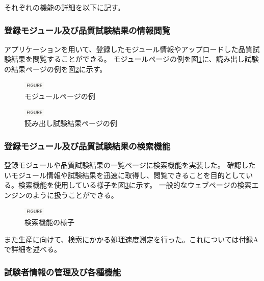 それぞれの機能の詳細を以下に記す。

\subsubsection{登録モジュール及び品質試験結果の情報閲覧}
アプリケーションを用いて、登録したモジュール情報やアップロードした品質試験結果を閲覧することができる。
モジュールページの例を図\ref{webapp_modulepage}に、読み出し試験の結果ページの例を図\ref{webapp_scanpage}に示す。

\begin{figure}[bpt]\centering
\includegraphics[width=1cm]{figure}
\caption[モジュールページの例]{モジュールページの例}
\label{webapp_modulepage}
\end{figure}

\begin{figure}[bpt]\centering
\includegraphics[width=1cm]{figure}
\caption[読み出し試験結果ページの例]{読み出し試験結果ページの例}
\label{webapp_scanpage}
\end{figure}

\subsubsection{登録モジュール及び品質試験結果の検索機能}
登録モジュールや品質試験結果の一覧ページに検索機能を実装した。
確認したいモジュール情報や試験結果を迅速に取得し、閲覧できることを目的としている。検索機能を使用している様子を図\ref{webapp_search_function}に示す。
一般的なウェブページの検索エンジンのように扱うことができる。

\begin{figure}[bpt]\centering
\includegraphics[width=1cm]{figure}
\caption[検索機能の様子]{検索機能の様子}
\label{webapp_search_function}
\end{figure}

また生産に向けて、検索にかかる処理速度測定を行った。これについては付録Aで詳細を述べる。

\subsubsection{試験者情報の管理及び各種機能}

